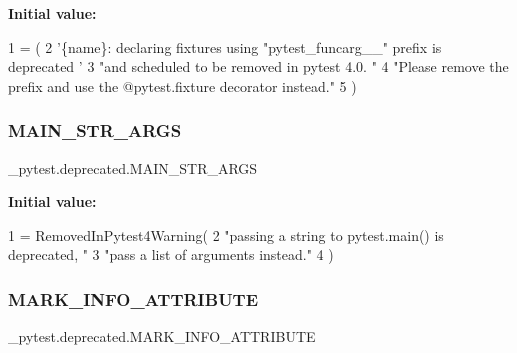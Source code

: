 {\bfseries Initial value\+:}
\begin{DoxyCode}
1 =  (
2     \textcolor{stringliteral}{'\{name\}: declaring fixtures using "pytest\_funcarg\_\_" prefix is deprecated '}
3     \textcolor{stringliteral}{"and scheduled to be removed in pytest 4.0.  "}
4     \textcolor{stringliteral}{"Please remove the prefix and use the @pytest.fixture decorator instead."}
5 )
\end{DoxyCode}
\mbox{\label{namespace__pytest_1_1deprecated_ae1b320f64dd5cf9bdd0406e43eb28560}} 
\subsubsection{\texorpdfstring{M\+A\+I\+N\+\_\+\+S\+T\+R\+\_\+\+A\+R\+GS}{MAIN\_STR\_ARGS}}
{\footnotesize\ttfamily \+\_\+pytest.\+deprecated.\+M\+A\+I\+N\+\_\+\+S\+T\+R\+\_\+\+A\+R\+GS}

{\bfseries Initial value\+:}
\begin{DoxyCode}
1 =  RemovedInPytest4Warning(
2     \textcolor{stringliteral}{"passing a string to pytest.main() is deprecated, "}
3     \textcolor{stringliteral}{"pass a list of arguments instead."}
4 )
\end{DoxyCode}
\mbox{\label{namespace__pytest_1_1deprecated_ab456b0a504c1f274eb2e0e4c71a29dc5}} 
\subsubsection{\texorpdfstring{M\+A\+R\+K\+\_\+\+I\+N\+F\+O\+\_\+\+A\+T\+T\+R\+I\+B\+U\+TE}{MARK\_INFO\_ATTRIBUTE}}
{\footnotesize\ttfamily \+\_\+pytest.\+deprecated.\+M\+A\+R\+K\+\_\+\+I\+N\+F\+O\+\_\+\+A\+T\+T\+R\+I\+B\+U\+TE}

